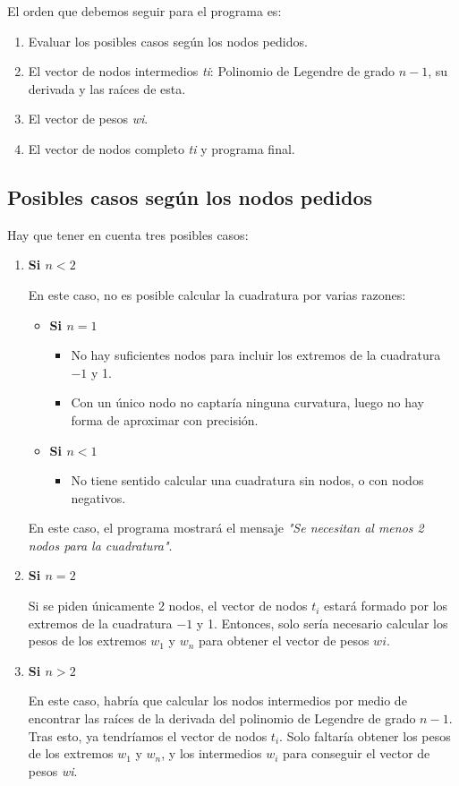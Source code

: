 \documentclass[a4paper]{article}
\begin{document}
El orden que debemos seguir para el programa es:
\begin{enumerate}
\item Evaluar los posibles casos según los nodos pedidos.
\item El vector de nodos intermedios \textit{ti}: Polinomio de Legendre de grado $n-1$, su derivada y las raíces de esta.
\item El vector de pesos \textit{wi}.
\item El vector de nodos completo \textit{ti} y programa final.
\end{enumerate}

\subsection{Posibles casos según los nodos pedidos}
Hay que tener en cuenta tres posibles casos:
\begin{enumerate}
\item \textbf{\boldmath Si $n<2$}

En este caso, no es posible calcular la cuadratura por varias razones:

    \begin{itemize}
    \item \textbf{\boldmath Si $n=1$}
        \begin{itemize}
        \item No hay suficientes nodos para incluir los extremos de la cuadratura $-1$ y 1.
        \item Con un único nodo no captaría ninguna curvatura, luego no hay forma de aproximar con precisión.
        \end{itemize}
    \item \textbf{\boldmath Si $n<1$}
        \begin{itemize}
        \item No tiene sentido calcular una cuadratura sin nodos, o con nodos negativos.
        \end{itemize}
    \end{itemize}

En este caso, el programa mostrará el mensaje \textit{"Se necesitan al menos 2 nodos para la cuadratura"}.

\item \textbf{\boldmath Si $n=2$}

Si se piden únicamente 2 nodos, el vector de nodos $t_i$ estará formado por los extremos de la cuadratura $-1$ y 1. Entonces, solo sería necesario calcular los pesos de los extremos $w_1$ y $w_n$ para obtener el vector de pesos $wi$.

\item \textbf{\boldmath Si $n>2$}

En este caso, habría que calcular los nodos intermedios por medio de encontrar las raíces de la derivada del polinomio de Legendre de grado $n-1$. Tras esto, ya tendríamos el vector de nodos $t_i$. Solo faltaría obtener los pesos de los extremos $w_1$ y $w_n$, y los intermedios $w_i$ para conseguir el vector de pesos \textit{wi}. 

\end{enumerate} 
\end{document}
